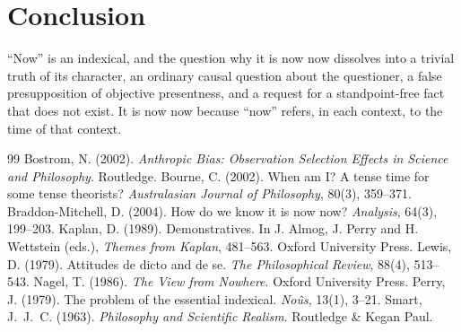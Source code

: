 \documentclass{situationist-preprint}
\begin{document}
\section{Conclusion}

\enquote{Now} is an indexical, and the question why it is now now dissolves into a trivial truth of its character, an ordinary causal question about the questioner, a false presupposition of objective presentness, and a request for a standpoint-free fact that does not exist. It is now now because \enquote{now} refers, in each context, to the time of that context.

\begin{thebibliography}{99}\small
{} Bostrom, N. (2002). \emph{Anthropic Bias: Observation Selection Effects in Science and Philosophy}. Routledge.
 Bourne, C. (2002). When am I? A tense time for some tense theorists? \emph{Australasian Journal of Philosophy}, 80(3), 359--371.
 Braddon-Mitchell, D. (2004). How do we know it is now now? \emph{Analysis}, 64(3), 199--203.
 Kaplan, D. (1989). Demonstratives. In J. Almog, J. Perry and H. Wettstein (eds.), \emph{Themes from Kaplan}, 481--563. Oxford University Press.
 Lewis, D. (1979). Attitudes de dicto and de se. \emph{The Philosophical Review}, 88(4), 513--543.
 Nagel, T. (1986). \emph{The View from Nowhere}. Oxford University Press.
 Perry, J. (1979). The problem of the essential indexical. \emph{No{\^u}s}, 13(1), 3--21.
 Smart, J.~J.~C. (1963). \emph{Philosophy and Scientific Realism}. Routledge \& Kegan Paul.
\end{thebibliography}
\end{document}
